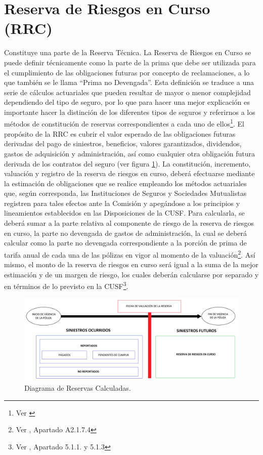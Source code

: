 \documentclass[11pt,twoside,openright,spanish]{report}
\numberwithin{equation}{chapter}
\numberwithin{figure}{chapter}
\numberwithin{table}{chapter}
\begin{document}
	\section{Reserva de Riesgos en Curso (RRC)}
Constituye una parte de la Reserva Técnica. La Reserva de Riesgos en Curso se puede definir técnicamente como la parte de la prima que debe ser utilizada para el cumplimiento de las obligaciones futuras por concepto de reclamaciones, a lo que también se le llama “Prima no Devengada”. Esta definición se traduce a una serie de cálculos actuariales que pueden resultar de mayor o menor complejidad dependiendo del tipo de seguro, por lo que para hacer una mejor explicación es importante hacer la distinción de los diferentes tipos de seguros y referirnos a los métodos de constitución de reservas correspondientes a cada uno de ellos\footnote{Ver \citet{RResAssal}}. El propósito de la RRC es cubrir el valor esperado de las obligaciones futuras derivadas del pago de siniestros, beneficios, valores garantizados, dividendos, gastos de adquisición y administración, así como cualquier otra obligación futura derivada de los contratos del seguro (ver figura \ref{reserva}).
La constitución, incremento, valuación y registro de la reserva de riesgos en curso, deberá efectuarse mediante la estimación de obligaciones que se realice empleando los métodos actuariales que, según corresponda, las Instituciones de Seguros y Sociedades Mutualistas registren para tales efectos ante la Comisión y apegándose a los principios y lineamientos establecidos en las Disposiciones de la CUSF. Para calcularla, se deberá sumar a la parte relativa al componente de riesgo de la reserva de riesgos en curso, la parte no devengada de gastos de administración, la cual se deberá calcular como la parte no devengada correspondiente a la porción de prima de tarifa anual de cada una de las pólizas en vigor al momento de la valuación\footnote{Ver \citet{SAnexoCUSF}, Apartado A2.1.7.4}. Así mismo, el monto de la reserva de riesgos en curso será igual a la suma de la mejor estimación y de un margen de riesgo, los cuales deberán calcularse por separado y en términos de lo previsto en la CUSF\footnote{Ver \citet{HCusf}, Apartado 5.1.1. y 5.1.3}.

	\begin{figure}[h!]
	\centering
	\includegraphics[width=\textwidth]{Imagenes/Diagrama Reservas.png}
	\caption{Diagrama de Reservas Calculadas.}
	\label{reserva}
	\end{figure}
 
\end{document}

